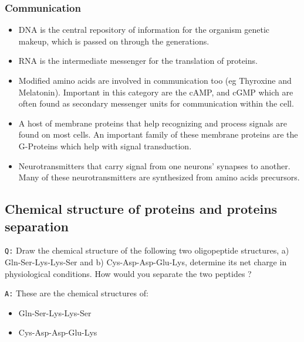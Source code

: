 \documentclass[11pt, a4paper,titlepage]{article}
\begin{document}
\subsubsection{Communication}
\label{sec-2-1-3}

\begin{itemize}
\item DNA is the central repository of information for the
  organism genetic makeup, which is passed on through the
  generations.
\item RNA is the intermediate messenger for the translation of
  proteins.
\item Modified amino acids are involved in communication too (eg Thyroxine
  and Melatonin). Important in this category are the cAMP, and cGMP
  which are often found as secondary messenger units for
  communication within the cell.
\item A host of membrane proteins that help recognizing and process
  signals are found on most cells. An important family of these
  membrane proteins are the G-Proteins which help with signal
  transduction.
\item Neurotransmitters that carry signal from one neurons' synapses to
  another. Many of these neurotransmitters are synthesized from amino
  acids precursors.
\end{itemize}
\subsection{Chemical structure of proteins and proteins separation}
\label{sec-2-2}

\texttt{Q:} Draw the chemical structure of the following two oligopeptide
structures, a) Gln-Ser-Lys-Lys-Ser and b) Cys-Asp-Asp-Glu-Lys,
determine its net charge in physiological conditions. How would you
separate the two peptides ?  

\texttt{A:} These are the chemical structures of:
\begin{itemize}
\item Gln-Ser-Lys-Lys-Ser

  \setatomsep{25pt}
\item Cys-Asp-Asp-Glu-Lys

  \setatomsep{25pt}
\end{itemize}
\end{document}
